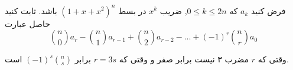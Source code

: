 فرض کنید 
$a_k$
كه
$0 \leq k \leq 2n$,
 ضریب 
 $x^k$ در بسط $(1 + x + x^2)^n$ باشد.
ثابت کنید حاصل عبارت
$${n \choose 0}a_r - {n \choose 1}a_{r - 1} + {n \choose 2}a_{r - 2} - ... + (-1)^r{n \choose r}a_0$$

وقتی که $r$ مضرب ۳ نیست برابر صفر و وقتی که $r = 3s$ برابر $(-1)^s{n \choose s}$ است.